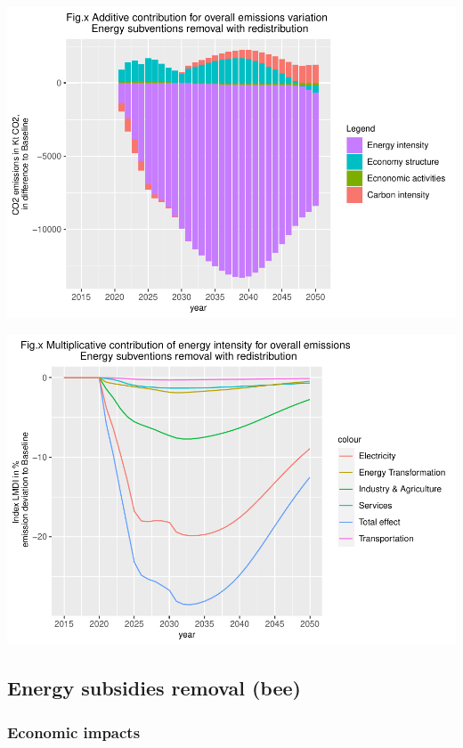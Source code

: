 \documentclass[
]{article}
\begin{document}
\includegraphics{Modele-ThreeMe-Tunisie_Sequeira_Valilou_Wang_files/figure-latex/unnamed-chunk-28-1.pdf}

\includegraphics{Modele-ThreeMe-Tunisie_Sequeira_Valilou_Wang_files/figure-latex/unnamed-chunk-29-1.pdf}

\hypertarget{energy-subsidies-removal-bee}{%
\subsection{Energy subsidies removal
(bee)}\label{energy-subsidies-removal-bee}}

\hypertarget{economic-impacts}{%
\subsubsection{Economic impacts}\label{economic-impacts}}
\end{document}
